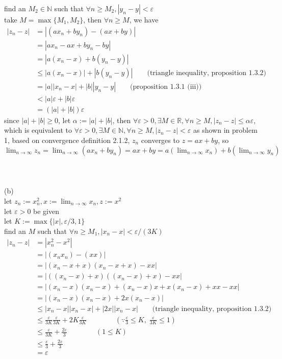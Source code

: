 \documentclass[12pt, border = 4pt, multi]{article} %
\begin{document}
find an $M_2 \in \mathbb{N}$ such that $\forall n \geq M_2, |y_n - y| < \varepsilon$\\
take $M = \max\{M_1, M_2\}$, then $\forall n \geq M$, we have
\begin{align*}
|z_n - z| &= |(ax_n + by_n) - (ax + by)|\\
&= |ax_n - ax + by_n - by|\\
&= |a(x_n - x) + b(y_n - y)|\\
&\leq |a(x_n - x)| + |b(y_n - y)| \qquad \text{(triangle inequality, proposition 1.3.2)}\\
&= |a||x_n - x| + |b||y_n - y| \qquad \text{(proposition 1.3.1 (iii))}\\
&< |a|\varepsilon + |b|\varepsilon\\
&= (|a| + |b|)\varepsilon
\end{align*}
since $|a| + |b| \geq 0$, let $\alpha := |a| + |b|$, then $\forall \varepsilon > 0, \exists M \in \mathbb{R}, \forall n \geq M, |z_n - z| \leq \alpha\varepsilon$, which is equivalent to $\forall \varepsilon > 0, \exists M \in \mathbb{N}, \forall n \geq M, |z_n - z| < \varepsilon$ as shown in problem 1, based on convergence definition 2.1.2, $z_n$ converges to $z = ax + by$, so $\lim_{n \rightarrow \infty} z_n = \lim_{n \rightarrow \infty}  (ax_n + by_n) = ax + by = a(\lim_{n \rightarrow \infty} x_n) + b(\lim_{n \rightarrow \infty} y_n)$\\
\\
\\
\\
(b)\\
let $z_n := x_n ^ 2, x := \lim_{n \rightarrow \infty} x_n, z := x ^ 2$\\
let $\varepsilon > 0$ be given\\
let $K := \max\{|x|, \varepsilon / 3, 1\}$\\
find an $M$ such that $\forall n \geq M_1, |x_n - x| < \varepsilon / (3K)$\\
\begin{align*}
|z_n - z| &= |x_n ^ 2 - x ^ 2|\\
&= |(x_n x_n) - (xx)|\\
&= |(x_n - x + x)(x_n - x + x) - xx|\\
&= |((x_n - x) + x)((x_n - x) + x) - xx|\\
&= |(x_n - x)(x_n - x) + (x_n - x)x + x(x_n - x) + xx - xx|\\
&= |(x_n - x)(x_n - x) + 2x(x_n - x)|\\
&\leq |x_n - x||x_n - x| + |2x||x_n - x| \qquad \text{(triangle inequality, proposition 1.3.2)}\\
&\leq \frac{\varepsilon}{3K}\frac{\varepsilon}{3K} + 2K\frac{\varepsilon}{3K} \qquad\qquad \left(\because \frac{\varepsilon}{3} \leq K,\; \frac{\varepsilon}{3K} \leq 1\right)\\
&\leq \frac{\varepsilon}{3K} + \frac{2\varepsilon}{3} \qquad\qquad (1 \leq K)\\
&\leq \frac{\varepsilon}{3} + \frac{2\varepsilon}{3}\\
&= \varepsilon
\end{align*}
\end{document}
